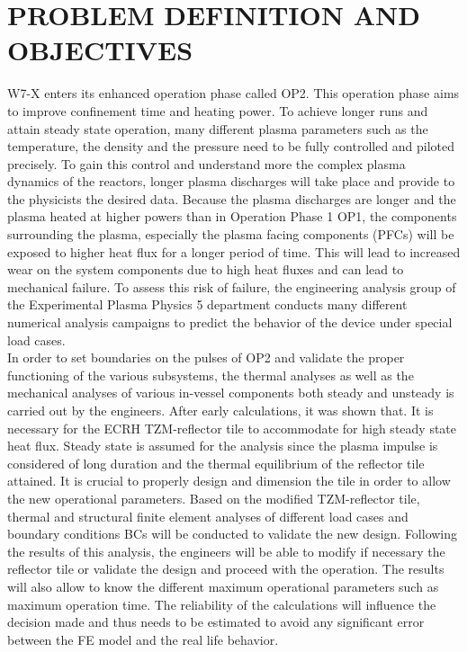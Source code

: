\section{PROBLEM DEFINITION AND OBJECTIVES}
{\normalsize W7-X enters its enhanced operation phase called \acrshort{OP2}. This operation phase aims to improve confinement time and heating power. To achieve longer runs and attain steady state operation, many different plasma parameters such as the temperature, the density and the pressure need to be fully controlled and piloted precisely. To gain this control and understand more the complex plasma dynamics of the reactors, longer plasma discharges will take place and provide to the physicists the desired data. Because the plasma discharges are longer and the plasma heated at higher powers than in Operation Phase 1 \acrshort{OP1}, the components surrounding the plasma, especially the plasma facing components (\acrshort{PFCs}) will be exposed to higher heat flux for a longer period of time. This will lead to increased wear on the system components due to high heat fluxes and can lead to mechanical failure. To assess this risk of failure, the engineering analysis group of the Experimental Plasma Physics 5 department conducts many different numerical analysis campaigns to predict the behavior of the device under special load cases.}
\\
\break
\normalsize{\indent In order to set boundaries on the pulses of \acrshort{OP2} and validate the proper functioning of the various subsystems, the thermal analyses as well as the mechanical analyses of various in-vessel components both steady and unsteady is carried out by the engineers. After early calculations, it was shown that. It is necessary for the ECRH TZM-reflector tile to accommodate for high steady state heat flux. Steady state is assumed for the analysis since the plasma impulse is considered of long duration and the thermal equilibrium of the reflector tile attained. It is crucial to properly design and dimension the tile in order to allow the new operational parameters. Based on the modified TZM-reflector tile, thermal and structural finite element analyses of different load cases and boundary conditions \acrshort{BCs} will be conducted to validate the new design. Following the results of this analysis, the engineers will be able to modify if necessary the reflector tile or validate the design and proceed with the operation. The results will also allow to know the different maximum operational parameters such as maximum operation time. The reliability of the calculations will influence the decision made and thus needs to be estimated to avoid any significant error between the FE model and the real life behavior.}

